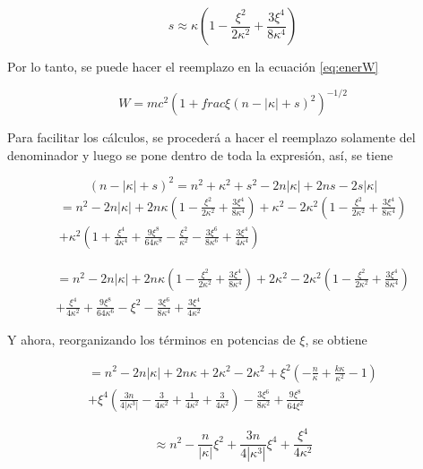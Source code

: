 \documentclass[a4paper, 12pt]{article} %
\begin{document}
\begin{equation}
s\approx \kappa \left( 1-\frac{\xi^2}{2\kappa^2}+\frac{3\xi^4}{8\kappa^4}  \right)
\end{equation}

Por lo tanto, se puede hacer el reemplazo en la ecuaci\'on \ref{eq:enerW}

\begin{equation}
W = mc^2 \left(1+frac{\xi}{(n-|\kappa|+s)^2} \right)^{-1/2}
\end{equation}

Para facilitar los c\'alculos, se proceder\'a a hacer el reemplazo solamente del denominador y luego se pone dentro de toda la expresi\'on, as\'i, se tiene

\[
(n-|\kappa| + s)^2 = n^2 + \kappa^2 + s^2 -2n|\kappa| +2ns -2s|\kappa| 
\]
\[
\begin{split}
= n^2-2n|\kappa|+2n\kappa \left( 1-\frac{\xi^2}{2\kappa^2} +\frac{3\xi^4}{8\kappa^4} \right) +\kappa^2 -2\kappa^2 \left( 1-\frac{\xi^2}{2\kappa^2} +\frac{3\xi^4}{8\kappa^4} \right) \\
+ \kappa^2 \left(  1+\frac{\xi^4}{4\kappa^4} +\frac{9\xi^8}{64\kappa^8} -\frac{\xi^2}{\kappa^2} -\frac{3\xi^6}{8\kappa^6} + \frac{3\xi^4}{4\kappa^4} \right)
\end{split}
\]

\[
\begin{split}
=n^2-2n|\kappa| +2n\kappa \left( 1-\frac{\xi^2}{2\kappa^2} +\frac{3\xi^4}{8\kappa^4} \right) +2\kappa^2 -2\kappa^2 \left( 1-\frac{\xi^2}{2\kappa^2} +\frac{3\xi^4}{8\kappa^4} \right) \\
+\frac{\xi^4}{4\kappa^2} +\frac{9\xi^8}{64\kappa^6} -\xi^2 -\frac{3\xi^6}{8\kappa^4} + \frac{3\xi^4}{4\kappa^2}
\end{split}
\]

Y ahora, reorganizando los t\'erminos en potencias de  $\xi$, se obtiene

\[
\begin{split}
=n^2 -2n|\kappa| + 2n\kappa + 2\kappa^2 - 2\kappa^2 + \xi^2 \left(  -\frac{n}{\kappa} + \frac{k\kappa}{\kappa^2} -1 \right) \\
+ \xi^4 \left(  \frac{3n}{4|\kappa^3|} -\frac{3}{4\kappa^2} +\frac{1}{4\kappa^2} + \frac{3}{4\kappa^2}  \right)  -\frac{3\xi^6}{8\kappa^2} + \frac{9\xi^8}{64\xi^2}
\end{split}
\]

\[
\approx n^2 - \frac{n}{|\kappa|}\xi^2 +\frac{3n}{4|\kappa^3|}\xi^4 +\frac{\xi^4}{4\kappa^2}
\]








\end{document}
